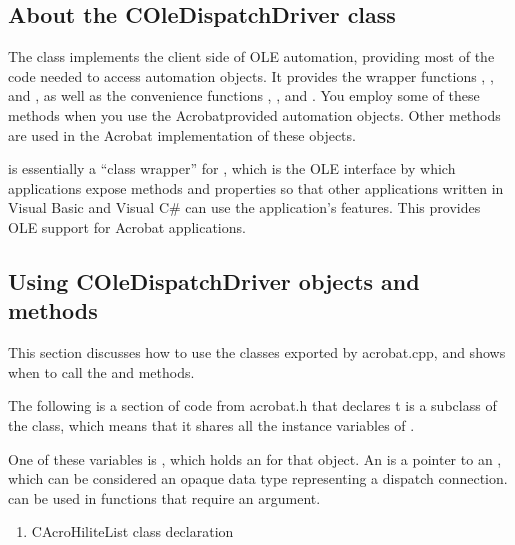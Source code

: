 \documentclass[letterpaper,12pt,english,openany,oneside]{sphinxmanual}
\begin{document}
\subsection{About the COleDispatchDriver class}
\label{\detokenize{IAC_DevApp_OLE_Support:about-the-coledispatchdriver-class}}
The  class implements the client side of OLE automation, providing most of the code needed to access automation objects. It provides the wrapper functions , , and , as well as the convenience functions , , and . You employ some of these methods when you use the Acrobat\sphinxhyphen{}provided automation objects. Other methods are used in the Acrobat implementation of these objects.

 is essentially a “class wrapper” for , which is the OLE interface by which applications expose methods and properties so that other applications written in Visual Basic and Visual C\# can use the application’s features. This provides OLE support for Acrobat applications.




\subsection{Using COleDispatchDriver objects and methods}
\label{\detokenize{IAC_DevApp_OLE_Support:using-coledispatchdriver-objects-and-methods}}
This section discusses how to use the classes exported by acrobat.cpp, and shows when to call the  and  methods.

The following is a section of code from acrobat.h that declares t    is a subclass of the  class, which means that it shares all the instance variables of .

One of these variables is , which holds an  for that object. An  is a  pointer to an , which can be considered an opaque data type representing a dispatch connection.  can be used in functions that require an  argument.
\begin{enumerate}
%
\item {} 
CAcroHiliteList class declaration

\end{enumerate}
\end{document}
